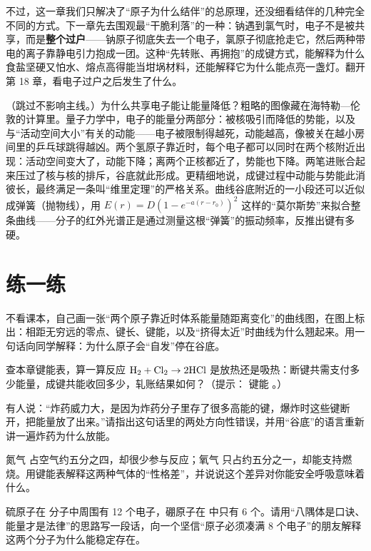 不过，这一章我们只解决了“原子为什么结伴”的总原理，还没细看结伴的几种完全不同的方式。下一章先去围观最“干脆利落”的一种：钠遇到氯气时，电子不是被共享，而是\textbf{整个过户}——钠原子彻底失去一个电子，氯原子彻底抢走它，然后两种带电的离子靠静电引力抱成一团。这种“先转账、再拥抱”的成键方式，能解释为什么食盐坚硬又怕水、熔点高得能当坩埚材料，还能解释它为什么能点亮一盏灯。翻开第 18 章，看电子过户之后发生了什么。

\begin{tiaozhan}
（跳过不影响主线。）为什么共享电子能让能量降低？粗略的图像藏在海特勒—伦敦的计算里。量子力学中，电子的能量分两部分：被核吸引而降低的势能，以及与“活动空间大小”有关的动能——电子被限制得越死，动能越高，像被关在越小房间里的乒乓球跳得越凶。两个氢原子靠近时，每个电子都可以同时在两个核附近出现：活动空间变大了，动能下降；离两个正核都近了，势能也下降。两笔进账合起来压过了核与核的排斥，谷底就此形成。更精细地说，成键过程中动能与势能此消彼长，最终满足一条叫“维里定理”的严格关系。曲线谷底附近的一小段还可以近似成弹簧（抛物线），用 $E(r)=D\left(1-e^{-a(r-r_0)}\right)^2$ 这样的“莫尔斯势”来拟合整条曲线——分子的红外光谱正是通过测量这根“弹簧”的振动频率，反推出键有多硬。
\end{tiaozhan}

\section*{练一练}

\begin{sikaoti}
\item 不看课本，自己画一张“两个原子靠近时体系能量随距离变化”的曲线图，在图上标出：相距无穷远的零点、键长、键能，以及“挤得太近”时曲线为什么翘起来。用一句话向同学解释：为什么原子会“自发”停在谷底。
\item 查本章键能表，算一算反应 $\mathrm{H_2} + \mathrm{Cl_2} \rightarrow \mathrm{2HCl}$ 是放热还是吸热：断键共需支付多少能量，成键共能收回多少，轧账结果如何？（提示： 键能 。）
\item 有人说：“炸药威力大，是因为炸药分子里存了很多高能的键，爆炸时这些键断开，把能量放了出来。”请指出这句话里的两处方向性错误，并用“谷底”的语言重新讲一遍炸药为什么放能。
\item 氮气  占空气约五分之四，却很少参与反应；氧气  只占约五分之一，却能支持燃烧。用键能表解释这两种气体的“性格差”，并说说这个差异对你能安全呼吸意味着什么。
\item 硫原子在  分子中周围有 12 个电子，硼原子在  中只有 6 个。请用“八隅体是口诀、能量才是法律”的思路写一段话，向一个坚信“原子必须凑满 8 个电子”的朋友解释这两个分子为什么能稳定存在。
\end{sikaoti}
